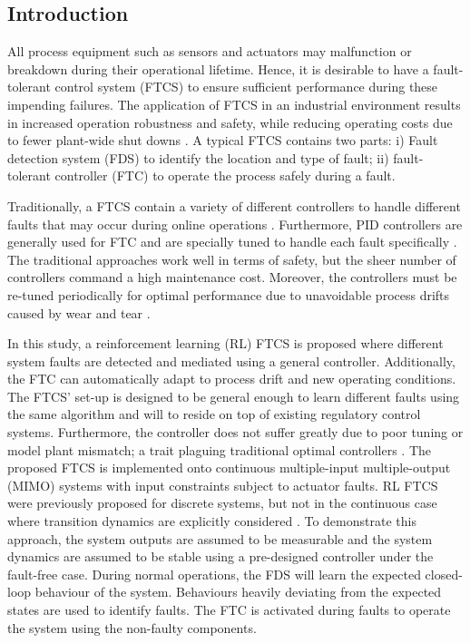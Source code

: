 \subsection{Introduction}
All process equipment such as sensors and actuators may malfunction or breakdown during their operational lifetime. Hence, it is desirable to have a fault-tolerant control system (FTCS) to ensure sufficient performance during these impending failures. The application of FTCS in an industrial environment results in increased operation robustness and safety, while reducing operating costs due to fewer plant-wide shut downs \cite{ftc_book_ref1}. A typical FTCS contains two parts: i) Fault detection system (FDS) to identify the location and type of fault; ii) fault-tolerant controller (FTC) to operate the process safely during a fault.

Traditionally, a FTCS contain a variety of different controllers to handle different faults that may occur during online operations \cite{ftc_book_ref1}. Furthermore, PID controllers are generally used for FTC and are specially tuned to handle each fault specifically \cite{process_faults}. The traditional approaches work well in terms of safety, but the sheer number of controllers command a  high maintenance cost.  Moreover, the controllers must be re-tuned periodically for optimal performance due to unavoidable process drifts caused by wear and tear \cite{process_control_ref13}.

In this study, a reinforcement learning (RL) FTCS is proposed where different system faults are detected and mediated using a general controller. Additionally, the FTC can automatically adapt to process drift and new operating conditions. The FTCS' set-up is designed to be general enough to learn different faults using the same algorithm and will to reside on top of existing regulatory control systems.  Furthermore, the controller does not suffer greatly due to poor tuning or model plant mismatch; a trait plaguing traditional optimal controllers \cite{model_plant_mismatch}.  The proposed FTCS is implemented onto continuous multiple-input multiple-output (MIMO) systems with input constraints subject to actuator faults. RL FTCS were previously proposed for discrete systems, but not in the continuous case where transition dynamics are explicitly considered \cite{ftc_ex2_ref5, ftc_ex1_ref6}. To demonstrate this approach, the system outputs are assumed to be measurable and the system dynamics are assumed to be stable using a pre-designed controller under the fault-free case.  During normal operations, the FDS will learn the expected closed-loop behaviour of the system.  Behaviours heavily deviating from the expected states are used to identify faults. The FTC is activated during faults to operate the system using the non-faulty components.

